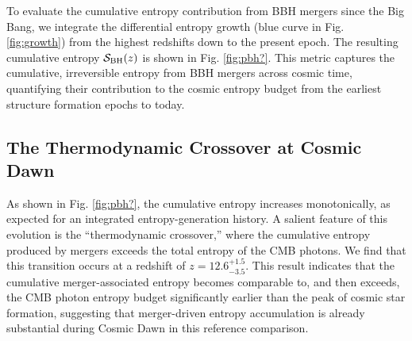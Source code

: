 \documentclass[twocolumn]{aastex631}
\begin{document}



To evaluate the cumulative entropy contribution from BBH mergers since the Big Bang, we integrate the differential entropy growth (blue curve in Fig. \ref{fig:growth}) from the highest redshifts down to the present epoch. The resulting cumulative entropy $\mathcal{S}_{\rm BH}(z)$ is shown in Fig. \ref{fig:pbh?}. This metric captures the cumulative, irreversible entropy from BBH mergers across cosmic time, quantifying their contribution to the cosmic entropy budget from the earliest structure formation epochs to today.

\subsection{The Thermodynamic Crossover at Cosmic Dawn}
\label{subsec:cmb_cross}
As shown in Fig. \ref{fig:pbh?}, the cumulative entropy increases monotonically, as expected for an integrated entropy-generation history. A salient feature of this evolution is the ``thermodynamic crossover,'' where the cumulative entropy produced by mergers exceeds the total entropy of the CMB photons. We find that this transition occurs at a redshift of $z = 12.6^{+1.5}_{-3.5}$. This result indicates that the cumulative merger-associated entropy becomes comparable to, and then exceeds, the CMB photon entropy budget significantly earlier than the peak of cosmic star formation, suggesting that merger-driven entropy accumulation is already substantial during Cosmic Dawn in this reference comparison.
\end{document}
